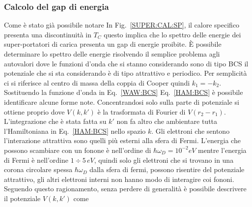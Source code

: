 \subsubsection{Calcolo del gap di energia}
Come \`e stato gi\`a possibile notare In Fig.~\ref{SUPER:CAL:SP}, il calore specifico presenta una discontinuit\`a in $T_C$ questo implica che lo spettro delle energie dei super-portatori di carica presenta un gap di energie proibite. \`E possibile determinare lo spettro delle energie risolvendo il semplice problema agli autovalori
dove le funzioni d'onda che si stanno considerando sono di tipo BCS
il potenziale che si sta considerando \`e di tipo attrattivo e periodico. Per semplicit\`a ci si riferisce al centro di massa della coppia di Cooper quindi $k_1=-k_2$. Sostituendo la funzione d'onda in Eq.~\ref{WAW:BCS} Eq.~\ref{HAM:BCS} \`e possibile identificare alcune forme note. Concentrandosi solo sulla parte di potenziale si ottiene proprio
dove $V(k,k')$ \`e  la trasformata di Fourier di $V(r_2-r_1)$. L'integrazione che \`e stata fatta su $k'$ non fa altro che ambientare tutta l'Hamiltoniana in Eq.~\ref{HAM:BCS} nello spazio $k$. Gli elettroni che sentono l'interazione attrattiva sono quelli pi\`u esterni alla sfera di Fermi. L'energia che possono scambiare con un fonone \`e nell'ordine di $\hbar\omega_D = 10^{-2} eV$ mentre l'energia di Fermi \`e nell'ordine $1\div5\,eV$, quindi solo gli elettroni che si trovano in una corona circolare spessa $\hbar\omega_D$ dalla sfera di fermi, possono risentire del potenziale attrattivo, gli altri elettroni interni non hanno modo di interagire coi fononi. Seguendo questo ragionamento, senza perdere di generalit\`a \`e possibile descrivere il potenziale $V(k,k')$ come
